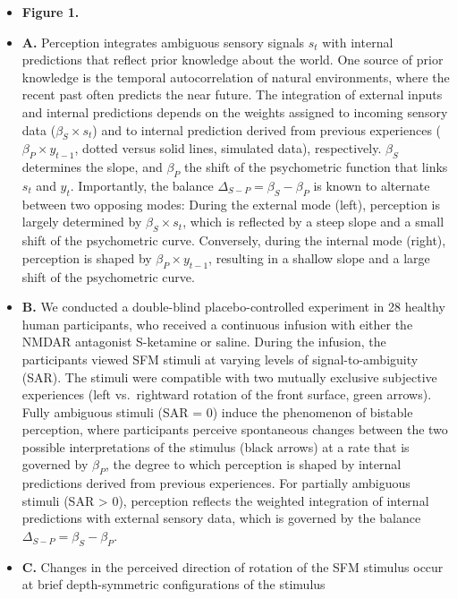 \documentclass[
]{article}
\begin{document}
\begin{itemize}
\item
  \textbf{Figure 1.}
\item
  \textbf{A.} Perception integrates ambiguous sensory signals \(s_t\)
  with internal predictions that reflect prior knowledge about the
  world. One source of prior knowledge is the temporal autocorrelation
  of natural environments, where the recent past often predicts the near
  future. The integration of external inputs and internal predictions
  depends on the weights assigned to incoming sensory data
  (\(\beta_S \times s_t\)) and to internal prediction derived from
  previous experiences (\(\beta_P \times y_{t-1}\), dotted versus solid
  lines, simulated data), respectively. \(\beta_S\) determines the
  slope, and \(\beta_P\) the shift of the psychometric function that
  links \(s_t\) and \(y_t\). Importantly, the balance
  \(\Delta_{S-P} = \beta_S - \beta_P\) is known to alternate between two
  opposing modes: During the external mode (left), perception is largely
  determined by \(\beta_S \times s_t\), which is reflected by a steep
  slope and a small shift of the psychometric curve. Conversely, during
  the internal mode (right), perception is shaped by
  \(\beta_P \times y_{t-1}\), resulting in a shallow slope and a large
  shift of the psychometric curve.
\item
  \textbf{B.} We conducted a double-blind placebo-controlled experiment
  in 28 healthy human participants, who received a continuous infusion
  with either the NMDAR antagonist S-ketamine or saline. During the
  infusion, the participants viewed SFM stimuli at varying levels of
  signal-to-ambiguity (SAR). The stimuli were compatible with two
  mutually exclusive subjective experiences (left vs.~rightward rotation
  of the front surface, green arrows). Fully ambiguous stimuli (SAR = 0)
  induce the phenomenon of bistable perception, where participants
  perceive spontaneous changes between the two possible interpretations
  of the stimulus (black arrows) at a rate that is governed by
  \(\beta_P\), the degree to which perception is shaped by internal
  predictions derived from previous experiences. For partially ambiguous
  stimuli (SAR \textgreater{} 0), perception reflects the weighted
  integration of internal predictions with external sensory data, which
  is governed by the balance \(\Delta_{S-P} = \beta_S - \beta_P\).
\item
  \textbf{C.} Changes in the perceived direction of rotation of the SFM
  stimulus occur at brief depth-symmetric configurations of the stimulus

\end{itemize}
\end{document}
